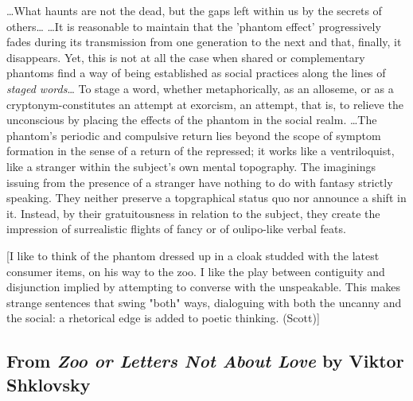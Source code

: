 \documentclass[
]{memoir}
\begin{document}
\ldots{}What haunts are not the dead, but the gaps left within us by the
secrets of others\ldots{} \ldots{}It is reasonable to maintain that the
'phantom effect' progressively fades during its transmission from one
generation to the next and that, finally, it disappears. Yet, this is
not at all the case when shared or complementary phantoms find a way of
being established as social practices along the lines of \emph{staged
words}\ldots{} To stage a word, whether metaphorically, as an alloseme,
or as a cryptonym-constitutes an attempt at exorcism, an attempt, that
is, to relieve the unconscious by placing the effects of the phantom in
the social realm. \ldots{}The phantom's periodic and compulsive return
lies beyond the scope of symptom formation in the sense of a return of
the repressed; it works like a ventriloquist, like a stranger within the
subject's own mental topography. The imaginings issuing from the
presence of a stranger have nothing to do with fantasy strictly
speaking. They neither preserve a topgraphical status quo nor announce a
shift in it. Instead, by their gratuitousness in relation to the
subject, they create the impression of surrealistic flights of fancy or
of oulipo-like verbal feats.

{[}I like to think of the phantom dressed up in a cloak studded with the
latest consumer items, on his way to the zoo. I like the play between
contiguity and disjunction implied by attempting to converse with the
unspeakable. This makes strange sentences that swing "both" ways,
dialoguing with both the uncanny and the social: a rhetorical edge is
added to poetic thinking. (Scott){]}

\hypertarget{from-zoo-or-letters-not-about-love-by-viktor-shklovsky}{%
\subsection*{\texorpdfstring{From \emph{Zoo or Letters Not About Love}
by Viktor
Shklovsky}{From Zoo or Letters Not About Love by Viktor Shklovsky}}\label{from-zoo-or-letters-not-about-love-by-viktor-shklovsky}}
\end{document}
